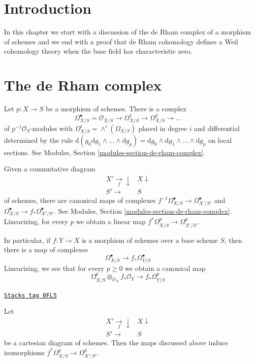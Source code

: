 \section{Introduction}
\label{derham-section-introduction}
In this chapter we start with a discussion of the de Rham complex
of a morphism of schemes and we end with a proof that de Rham cohomology
defines a Weil cohomology theory when the base field has characteristic zero.

\section{The de Rham complex}
\label{derham-section-de-rham-complex}
Let $p : X \to S$ be a morphism of schemes. There is a complex
$$
\Omega^\bullet_{X/S} =
\mathcal{O}_{X/S} \to \Omega^1_{X/S} \to \Omega^2_{X/S} \to \ldots
$$
of $p^{-1}\mathcal{O}_S$-modules with
$\Omega^i_{X/S} = \wedge^i(\Omega_{X/S})$
placed in degree $i$ and differential determined by the rule
$\text{d}(g_0 \text{d}g_1 \wedge \ldots \wedge \text{d}g_p) =
\text{d}g_0 \wedge \text{d}g_1 \wedge \ldots \wedge \text{d}g_p$
on local sections.
See Modules, Section \ref{modules-section-de-rham-complex}.

\medskip\noindent
Given a commutative diagram
$$
\begin{array}{cc}X' \underset{f}{\longrightarrow}\downarrow & X \downarrow \\ S' \longrightarrow & S\end{array}
$$
of schemes, there are canonical maps of complexes
$f^{-1}\Omega_{X/S}^\bullet \to \Omega^\bullet_{X'/S'}$ and
$\Omega_{X/S}^\bullet \to f_*\Omega^\bullet_{X'/S'}$.
See Modules, Section \ref{modules-section-de-rham-complex}.
Linearizing, for every $p$ we obtain a linear map
$f^*\Omega^p_{X/S} \to \Omega^p_{X'/S'}$.

\medskip\noindent
In particular, if $f : Y \to X$ is a morphism of schemes over
a base scheme $S$, then there is a map of complexes
$$
\Omega^\bullet_{X/S} \longrightarrow f_*\Omega^\bullet_{Y/S}
$$
Linearizing, we see that for every $p \geq 0$ we obtain a canonical map
$$
\Omega^p_{X/S} \otimes_{\mathcal{O}_X} f_*\mathcal{O}_Y
\longrightarrow
f_*\Omega^p_{Y/S}
$$

\begin{lemma}
\label{derham-lemma-base-change-de-rham}
\href{https://stacks.math.columbia.edu/tag/0FL5}{\texttt{Stacks tag 0FL5}}

Let
$$
\begin{array}{cc}X' \underset{f}{\longrightarrow}\downarrow & X \downarrow \\ S' \longrightarrow & S\end{array}
$$
be a cartesian diagram of schemes. Then the maps discussed
above induce isomorphisms
$f^*\Omega^p_{X/S} \to \Omega^p_{X'/S'}$.
\end{lemma}

